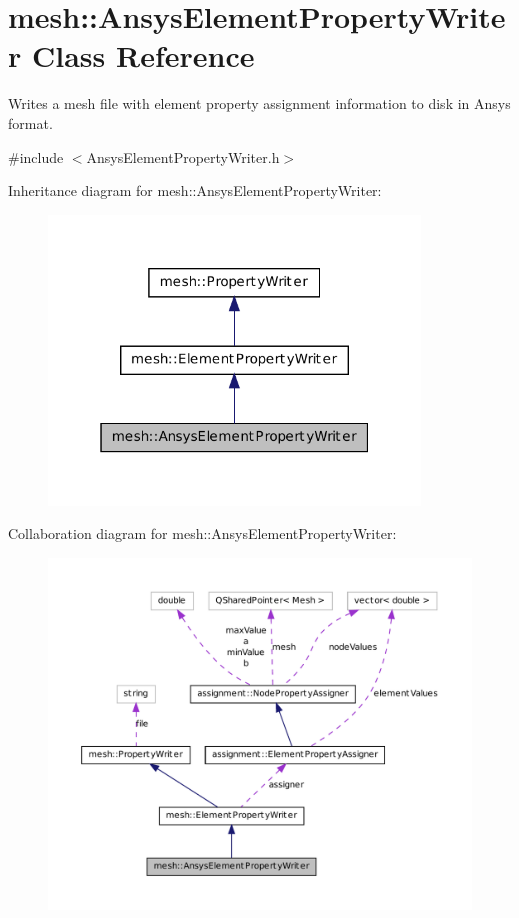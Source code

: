 \hypertarget{classmesh_1_1_ansys_element_property_writer}{
\section{mesh::AnsysElementPropertyWriter Class Reference}
\label{classmesh_1_1_ansys_element_property_writer}
}


Writes a mesh file with element property assignment information to disk in Ansys format.  




{\ttfamily \#include $<$AnsysElementPropertyWriter.h$>$}



Inheritance diagram for mesh::AnsysElementPropertyWriter:\nopagebreak
\begin{figure}[H]
\begin{center}
\leavevmode
\includegraphics[width=280pt]{classmesh_1_1_ansys_element_property_writer__inherit__graph}
\end{center}
\end{figure}


Collaboration diagram for mesh::AnsysElementPropertyWriter:\nopagebreak
\begin{figure}[H]
\begin{center}
\leavevmode
\includegraphics[width=400pt]{classmesh_1_1_ansys_element_property_writer__coll__graph}
\end{center}
\end{figure}
